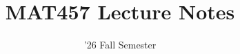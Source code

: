 \documentclass[11pt]{article}
\begin{document}
\title{MAT457 Lecture Notes}
\date{'26 Fall Semester} %
\maketitle

\setcounter{tocdepth}{1}
\tableofcontents
\newpage


\end{document}

